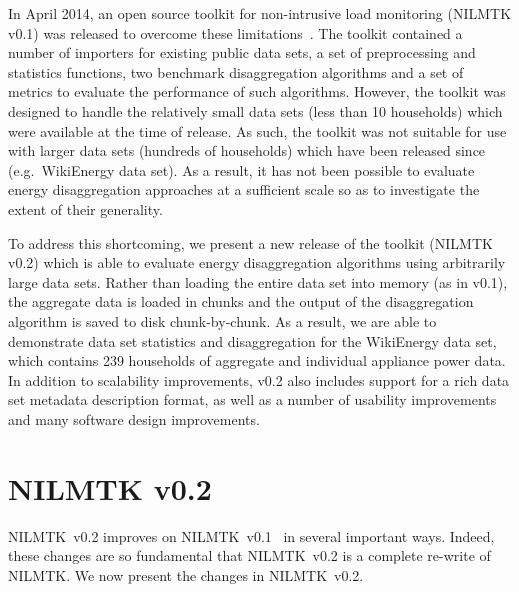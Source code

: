 \documentclass[10pt,abstract]{sensys-proc}
\begin{document}
In April 2014, an open source toolkit for non-intrusive load monitoring (NILMTK v0.1) was released to overcome these limitations~\cite{nilmtk}. The toolkit contained a number of importers for existing public data sets, a set of preprocessing and statistics functions, two benchmark disaggregation algorithms and a set of metrics to evaluate the performance of such algorithms. However, the toolkit was designed to handle the relatively small data sets (less than 10 households) which were available at the time of release. As such, the toolkit was not suitable for use with larger data sets (hundreds of households) which have been released since (e.g.\ WikiEnergy data set). As a result, it has not been possible to evaluate energy disaggregation approaches at a sufficient scale so as to investigate the extent of their generality.

To address this shortcoming, we present a new release of the toolkit (NILMTK v0.2) which is able to evaluate energy disaggregation algorithms using arbitrarily large data sets.  Rather than loading the entire data set into memory (as in v0.1), the aggregate data is loaded in chunks and the output of the disaggregation algorithm is saved to disk chunk-by-chunk. As a result, we are able to demonstrate data set statistics and disaggregation for the WikiEnergy data set, which contains 239 households of aggregate and individual appliance power data. In addition to scalability improvements, v0.2 also includes support for a rich data set metadata description format, as well as a number of usability improvements and many software design improvements.

\section{NILMTK v0.2}

NILMTK~v0.2 improves on NILMTK~v0.1~\cite{nilmtk} in several important ways.  Indeed, these changes are so fundamental that NILMTK~v0.2 is a complete re-write of NILMTK. We now present the changes in NILMTK~v0.2.
\end{document}
